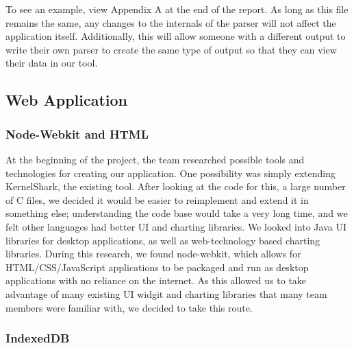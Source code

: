 \documentclass{hmcclinic}
\begin{document}
  To see an example, view Appendix A at the end of the report.
  \newline
  \newline
  As long as this file remains the same, any changes to the internals of the
  parser will not affect the application itself. Additionally, this will allow
  someone with a different output to write their own parser to create the same
  type of output so that they can view their data in our tool.

  \subsection{Web Application}

  
  \subsubsection{Node-Webkit and HTML} %
    At the beginning of the project, the team researched possible tools and
    technologies for creating our application. One possibility was simply
    extending KernelShark, the existing tool. After looking at the code for
    this, a large number of C files, we decided it would be easier to
    reimplement and extend it in something else; understanding the code base
    would take a very long time, and we felt other languages had better
    UI and charting libraries. We looked into Java UI libraries for
    desktop applications, as well as web-technology based charting libraries.
    During this research, we found node-webkit, which allows for
    HTML/CSS/JavaScript applications to be packaged and run as desktop
    applications with no reliance on the internet. As this allowed us to take
    advantage of many existing UI widgit and charting libraries that many team
    members were familiar with, we decided to take this route.

  \subsubsection{IndexedDB}
\end{document}
